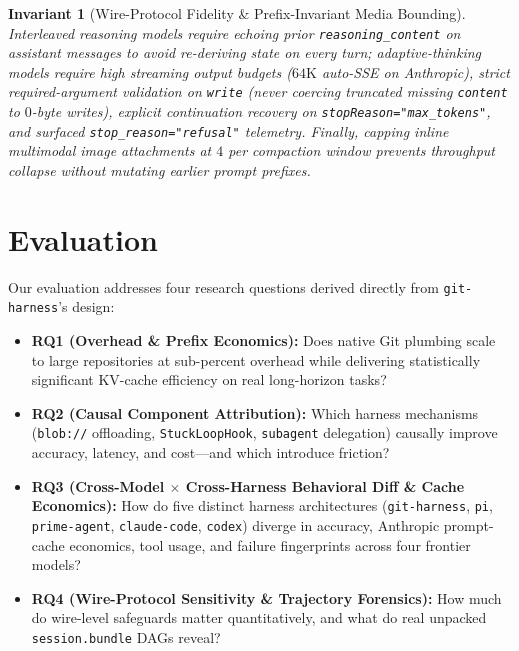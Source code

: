 \documentclass[11pt]{article}
\newtheorem{invariant}{Invariant}
\begin{document}
\begin{invariant}[Wire-Protocol Fidelity \& Prefix-Invariant Media Bounding]
Interleaved reasoning models require echoing prior \texttt{reasoning\_content} on assistant messages to avoid re-deriving state on every turn; adaptive-thinking models require high streaming output budgets ($64\mathrm{K}$ auto-SSE on Anthropic), strict required-argument validation on \texttt{write} (never coercing truncated missing \texttt{content} to $0$-byte writes), explicit continuation recovery on \texttt{stopReason="max\_tokens"}, and surfaced \texttt{stop\_reason="refusal"} telemetry. Finally, capping inline multimodal image attachments at $4$ per compaction window prevents throughput collapse without mutating earlier prompt prefixes.
\end{invariant}

\section{Evaluation}
\label{sec:evaluation}

Our evaluation addresses four research questions derived directly from \texttt{git-harness}'s design:
\begin{itemize}[leftmargin=*,nosep]
  \item \textbf{RQ1 (Overhead \& Prefix Economics):} Does native Git plumbing scale to large repositories at sub-percent overhead while delivering statistically significant KV-cache efficiency on real long-horizon tasks?
  \item \textbf{RQ2 (Causal Component Attribution):} Which harness mechanisms (\texttt{blob://} offloading, \texttt{StuckLoopHook}, \texttt{subagent} delegation) causally improve accuracy, latency, and cost---and which introduce friction?
  \item \textbf{RQ3 (Cross-Model $\times$ Cross-Harness Behavioral Diff \& Cache Economics):} How do five distinct harness architectures (\texttt{git-harness}, \texttt{pi}, \texttt{prime-agent}, \texttt{claude-code}, \texttt{codex}) diverge in accuracy, Anthropic prompt-cache economics, tool usage, and failure fingerprints across four frontier models?
  \item \textbf{RQ4 (Wire-Protocol Sensitivity \& Trajectory Forensics):} How much do wire-level safeguards matter quantitatively, and what do real unpacked \texttt{session.bundle} DAGs reveal?
\end{itemize}
\end{document}
